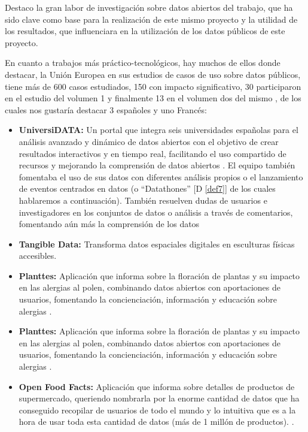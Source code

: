 	Destaco la gran labor de investigación sobre datos abiertos del trabajo, que ha sido clave como base para la realización de este mismo proyecto y la utilidad de los resultados, que influenciara en la utilización de los datos públicos de este proyecto.
	
	En cuanto a trabajos más práctico-tecnológicos, hay muchos de ellos donde destacar, la Unión Europea en sus estudios de casos de uso sobre datos públicos, tiene más de 600 casos estudiados, 150 con impacto significativo, 30 participaron en el estudio del volumen 1 \citep{UseCaseObservatory2022V1} y finalmente 13 en el volumen dos del mismo \citep{UseCaseObservatory2024V2}, de los cuales nos gustaría destacar 3 españoles y uno Francés:
	\begin{itemize}
		\item \textbf{UniversiDATA:} Un portal que integra seis universidades españolas para el análisis avanzado y dinámico de datos abiertos con el objetivo de crear resultados interactivos y en tiempo real, facilitando el uso compartido de recursos y mejorando la comprensión de datos abiertos \citep{UniversiDATA}. El equipo también fomentaba el uso de sus datos con diferentes análisis propios \citep{UniversiDATAAnalisis} o el lanzamiento de eventos centrados en datos (o ``Datathones'' [D \ref{def7}] \citep{UniversiDATADatathon} de los cuales hablaremos a continuación). También resuelven dudas de usuarios e investigadores en los conjuntos de datos o análisis a través de comentarios, fomentando aún más la comprensión de los datos 
		\item \textbf{Tangible Data:} Transforma datos espaciales digitales en esculturas físicas accesibles.
		\item \textbf{Planttes:} Aplicación que informa sobre la floración de plantas y su impacto en las alergias al polen, combinando datos abiertos con aportaciones de usuarios, fomentando la concienciación, información y educación sobre alergias \citep{PlanttesDataAPP}.
		\item \textbf{Planttes:} Aplicación que informa sobre la floración de plantas y su impacto en las alergias al polen, combinando datos abiertos con aportaciones de usuarios, fomentando la concienciación, información y educación sobre alergias \citep{PlanttesDataAPP}.
		\item \textbf{Open Food Facts:} Aplicación que informa sobre detalles de productos de supermercado, queriendo nombrarla por la enorme cantidad de datos que ha conseguido recopilar de usuarios de todo el mundo y lo intuitiva que es a la hora de usar toda esta cantidad de datos (más de 1 millón de productos). \citep{OpenFoodFactsDataAPP}.
	\end{itemize}
	

